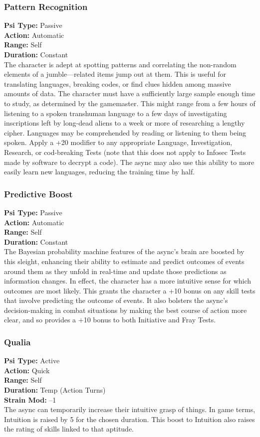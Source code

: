 \subsubsection{Pattern Recognition} \textbf{Psi Type:} Passive \\ \textbf{Action:} Automatic \\ \textbf{Range:} Self \\ \textbf{Duration:} Constant \\ The character is adept at spotting patterns and correlating the non-random elements of a jumble—related items jump out at them. This is useful for translating languages, breaking codes, or find clues hidden among massive amounts of data. The character must have a sufficiently large sample enough time to study, as determined by the gamemaster. This might range from a few hours of listening to a spoken transhuman language to a few days of investigating inscriptions left by long-dead aliens to a week or more of researching a lengthy cipher. Languages may be comprehended by reading or listening to them being spoken. Apply a +20 modifier to any appropriate Language, Investigation, Research, or cod-breaking Tests (note that this does not apply to Infosec Tests made by software to decrypt a code). The async may also use this ability to more easily learn new languages, reducing the training time by half. 

\subsubsection{Predictive Boost} \textbf{Psi Type:} Passive \\ \textbf{Action:} Automatic \\ \textbf{Range:} Self \\ \textbf{Duration:} Constant \\ The Bayesian probability machine features of the async’s brain are boosted by this sleight, enhancing their ability to estimate and predict outcomes of events around them as they unfold in real-time and update those predictions as information changes. In effect, the character has a more intuitive sense for which outcomes are most likely. This grants the character a +10 bonus on any skill tests that involve predicting the outcome of events. It also bolsters the async’s decision-making in combat situations by making the best course of action more clear, and so provides a +10 bonus to both Initiative and Fray Tests. 

\subsubsection{Qualia} \textbf{Psi Type:} Active \\ \textbf{Action:} Quick \\ \textbf{Range:} Self \\ \textbf{Duration:} Temp (Action Turns) \\ \textbf{Strain Mod:} –1 \\ The async can temporarily increase their intuitive grasp of things. In game terms, Intuition is raised by 5 for the chosen duration. This boost to Intuition also raises the rating of skills linked to that aptitude. 

